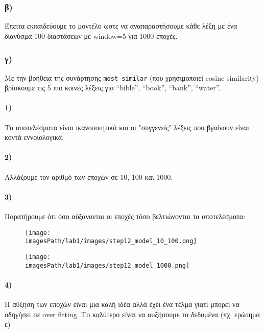 \documentclass[a4paper, 12pt]{article}
\newcommand{\imagesPath}{.}
\begin{document}
        \subsubsection*{β)}
         	Έπειτα εκπαιδεύουμε το μοντέλο ωστε να αναπαραστήσουμε κάθε λέξη με ένα διανύσμα 100 διαστάσεων με  window=5 για 1000 εποχές.  

        \subsubsection*{γ)}
        	Με την βοήθεια της συνάρτησης \verb|most_similar| (που χρησιμοποιεί cosine similarity) βρίσκουμε  τις 5 πιο κοινές λέξεις για “bible”, “book”, “bank”, “water”.

            \paragraph*{1)}
            	Τα αποτελέσματα είναι ικανοποιητικά και οι "συγγενείς" λέξεις που βγαίνουν είναι κοντά εννοιολογικά.

            \paragraph*{2)}
            	Αλλάζουμε τον αριθμό των εποχών σε 10, 100 και 1000.

            \paragraph*{3)}
            	Παρατήρουμε ότι όσο αύξανονται οι εποχές τόσο βελτιώνονται τα αποτελέσματα:
			\begin{figure}[H]
				\texttt{[image: \\imagesPath/lab1/images/step12\_model\_10\_100.png]}
			\end{figure}
			
            \begin{figure}[H]
				\texttt{[image: \\imagesPath/lab1/images/step12\_model\_1000.png]}
            \end{figure}
            
            \paragraph*{4)}
            	Η αύξηση των εποχών είναι μια καλή ιδέα αλλά έχει ένα τέλμα γιατί μπορεί να οδηγήσει σε over fitting. Το καλύτερο είναι να αυξήσουμε τα δεδομένα (πχ. ερώτημα ε)
        
\end{document}
